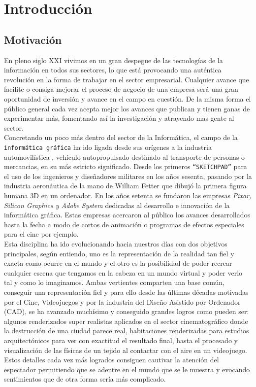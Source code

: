 \chapter{Introducción}
\section{Motivación}
En pleno siglo XXI vivimos en un gran despegue de las tecnologías de la información en todos sus sectores, lo que está provocando una auténtica revolución en la forma de trabajar en el sector empresarial. Cualquier avance que facilite o consiga mejorar el proceso de negocio de una empresa será una gran oportunidad de inversión y avance en el campo en cuestión. De la misma forma el público general cada vez acepta mejor los avances que publican y tienen ganas de experimentar más, fomentando así la investigación y atrayendo mas gente al sector.\\

Concretando un poco más dentro del sector de la Informática, el campo de la \texttt{informática gráfica} ha ido ligada desde sus orígenes a la industria automovilística 
\cite{ohiostateuniversitySectionIndustryEvolves2007}
, vehículo autopropulsado destinado al transporte de personas o mercancias, en su más estricto significado. Desde los primeros \texttt{``SKETCHPAD''} para el uso de los ingenieros y diseñadores militares en los años sesenta, pasando por la industria aeronáutica de la mano de William Fetter \cite{frankeComputerGraphicsComputer2012} que dibujó la primera figura humana 3D en un ordenador. En los años setenta se fundaron las empresas \textit{Pixar, Silicon Graphics y Adobe System} dedicadas al desarrollo e innovación de la informática gráfica. Estas empresas acercaron al público  los avances desarrollados hasta la fecha a modo de cortos de animación o programas de efectos especiales para el cine por ejemplo.\\

Esta disciplina ha ido evolucionando hacia nuestros días con dos objetivos principales, según entiendo, uno   es la representación de la realidad tan fiel y exacta como ocurre en el mundo y el otro es la posibilidad de poder recrear cualquier escena que tengamos en la cabeza en un mundo virtual y poder verlo tal y como lo imaginamos. Ambas vertientes comparten una base común, conseguir una representación fiel y para ello desde las últimas décadas motivadas por el Cine, Videojuegos y por la industria del Diseño Asistido por Ordenador (CAD), se ha avanzado muchísimo y conseguido grandes logros como pueden ser: algunos renderizados super realistas aplicados en el sector cinematográfico donde la destrucción de una ciudad parece real, habitaciones renderizadas para estudios arquitectónicos para ver con exactitud el resultado final, hasta el procesado y visualización de las físicas de un tejido al contactar con el aire en un videojuego. Estos detalles cada vez más logrados consiguen cautivar la atención del espectador permitiendo que se adentre en el mundo que se le muestra y evocando sentimientos que de otra forma sería más complicado.\\

